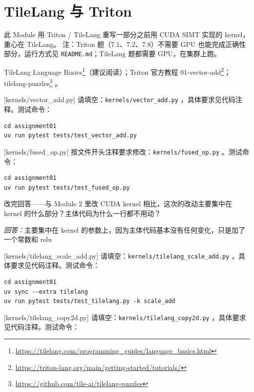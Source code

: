 \documentclass[11pt,a4paper,fontset=none]{ctexart}
\begin{document}
\section{TileLang 与 Triton}

此 Module 用 Triton / TileLang 重写一部分之前用 CUDA SIMT 实现的 kernel，重心在 TileLang。
注：Triton 题（7.1、7.2、7.8）不需要 GPU 也能完成正确性部分，运行方式见 \texttt{README.md}；TileLang 题都需要 GPU，在集群上跑。

\begin{reading}
TileLang Language Basics\footnote{\url{https://tilelang.com/programming_guides/language_basics.html}}（建议阅读）；Triton 官方教程 01-vector-add\footnote{\url{https://triton-lang.org/main/getting-started/tutorials/}}；tilelang-puzzles\footnote{\url{https://github.com/tile-ai/tilelang-puzzles}} 。
\end{reading}

[kernels/vector\_add.py]
请填空：\texttt{kernels/vector\_add.py} ，具体要求见代码注释。测试命令：

\begin{lstlisting}
cd assignment01
uv run pytest tests/test_vector_add.py
\end{lstlisting}

[kernels/fused\_op.py]
按文件开头注释要求修改：\texttt{kernels/fused\_op.py} 。测试命令：

\begin{lstlisting}
cd assignment01
uv run pytest tests/test_fused_op.py
\end{lstlisting}

改完回答——与 Module 2 里改 CUDA kernel 相比，这次的改动主要集中在 kernel 的什么部分？主体代码为什么一行都不用动？
\par\noindent\textit{回答：}主要集中在 kernel 的参数上，因为主体代码基本没有任何变化，只是加了一个常数和 relu

[kernels/tilelang\_scale\_add.py]
请填空：\texttt{kernels/tilelang\_scale\_add.py} ，具体要求见代码注释。测试命令：

\begin{lstlisting}
cd assignment01
uv sync --extra tilelang
uv run pytest tests/test_tilelang.py -k scale_add
\end{lstlisting}

[kernels/tilelang\_copy2d.py]
请填空：\texttt{kernels/tilelang\_copy2d.py} ，具体要求见代码注释。测试命令：
\end{document}
